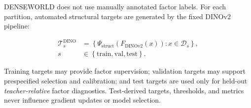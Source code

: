DENSEWORLD does not use manually annotated factor labels. For each
partition, automated structural targets are generated by the fixed
DINOv2 pipeline:

\begin{equation*}
\begin{aligned}
\mathcal T_s^{\mathrm{DINO}}
&=
\left\{
\Psi_{\mathrm{struct}}
\!\left(
F_{\mathrm{DINOv2}}(x)
\right)
:
x\in\mathcal D_s
\right\},
\\[-1pt]
s
&\in
\left\{
\mathrm{train},
\mathrm{val},
\mathrm{test}
\right\}.
\end{aligned}
\end{equation*}


Training targets may provide factor supervision; validation targets may
support prespecified selection and calibration; and test targets are
used only for held-out \emph{teacher-relative} factor diagnostics.
Test-derived targets, thresholds, and metrics never influence gradient
updates or model selection.

